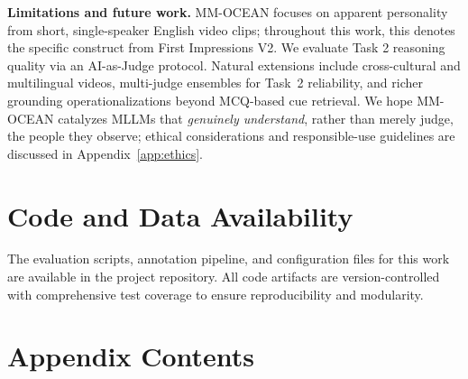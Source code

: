 \documentclass{llmxive}
\makeatletter
\providecommand{\benchname}{MM-OCEAN}
\providecommand{\thefigure}{A\arabic{figure}}
\providecommand{\thetable}{A\arabic{table}}
\providecommand{\tocrow}[3]{\textbf{\S\ref{#1}~~#2} & #3 \\}
\providecommand{\tocgroup}[1]{\addlinespace[6pt]\multicolumn{2}{@{}l}{\textsc{\textbf{#1}}} \\[2pt]}
\makeatother
\begin{document}
\noindent\textbf{Limitations and future work.}
\benchname{} focuses on apparent personality from short, single-speaker English video clips; throughout this work, this denotes the specific construct from First Impressions V2. We evaluate Task 2 reasoning quality via an AI-as-Judge protocol. 
Natural extensions include cross-cultural and multilingual videos, multi-judge ensembles for Task~2 reliability, and richer grounding operationalizations beyond MCQ-based cue retrieval. We hope \benchname{} catalyzes MLLMs that \emph{genuinely understand}, rather than merely judge, the people they observe; ethical considerations and responsible-use guidelines are discussed in Appendix~\ref{app:ethics}.


\section*{Code and Data Availability}

The evaluation scripts, annotation pipeline, and configuration files for this work are available in the project repository. All code artifacts are version-controlled with comprehensive test coverage to ensure reproducibility and modularity.




\appendix
\setcounter{figure}{0}
\setcounter{table}{0}
\renewcommand{\thefigure}{A\arabic{figure}}
\renewcommand{\thetable}{A\arabic{table}}

\renewcommand{\tocrow}[3]{\textbf{\S\ref{#1}~~#2} & #3 \\}
\renewcommand{\tocgroup}[1]{\addlinespace[6pt]\multicolumn{2}{@{}l}{\textsc{\textbf{#1}}} \\[2pt]}

\section*{Appendix Contents}
\label{app:toc}
\end{document}
